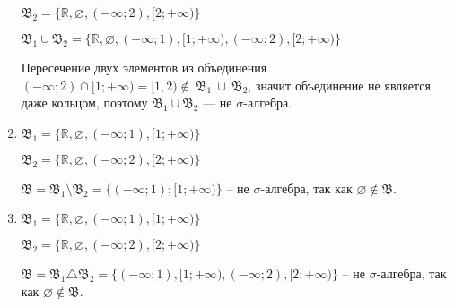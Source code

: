\begin{solution}
\begin{enumerate}[1)]
    $\mathfrak{B_2} = \{\mathbb{R}, \varnothing, (-\infty; 2), [2; +\infty)\}$
    
    $\mathfrak{B_1} \cup \mathfrak{B_2} = \{\mathbb{R}, \varnothing, (-\infty; 1), [1; +\infty), (-\infty; 2), [2; +\infty)\}$
    
    Пересечение двух элементов из объединения $(-\infty; 2) \cap [1; +\infty) = [1, 2) \notin~\mathfrak{B_1}~\cup~\mathfrak{B_2}$, значит объединение не является даже кольцом, поэтому $\mathfrak{B_1} \cup \mathfrak{B_2}$ --- не $\sigma$-алгебра.
    
    \item
    $\mathfrak{B_1} = \{\mathbb{R}, \varnothing, (-\infty; 1), [1; +\infty)\}$
    
    $\mathfrak{B_2} = \{\mathbb{R}, \varnothing, (-\infty; 2), [2; +\infty)\}$
    
    $\mathfrak{B} = \mathfrak{B}_1 \setminus \mathfrak{B}_2 = \{(-\infty; 1);[1;+\infty)\} $ -- не $\sigma$-алгебра, так как $\varnothing \notin \mathfrak{B}$.
    
    \item
    $\mathfrak{B_1} = \{\mathbb{R}, \varnothing, (-\infty; 1), [1; +\infty)\}$
    
    $\mathfrak{B_2} = \{\mathbb{R}, \varnothing, (-\infty; 2), [2; +\infty)\}$
    
    $\mathfrak{B} = \mathfrak{B}_1 \triangle \mathfrak{B}_2 = \{(-\infty; 1),[1;+\infty),(-\infty; 2), [2; +\infty)\} $ -- не $\sigma$-алгебра, так как $\varnothing \notin \mathfrak{B}$.
\end{enumerate}
\end{solution}